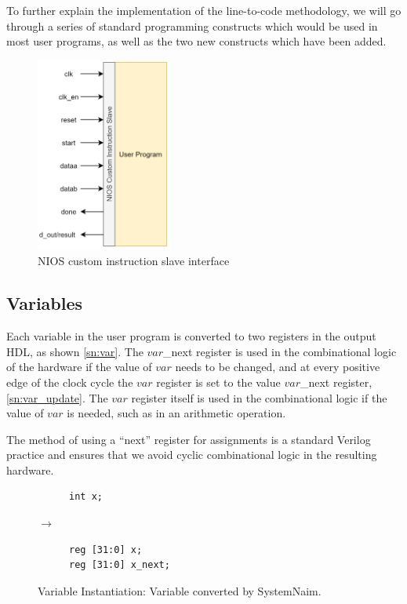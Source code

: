 To further explain the implementation of the line-to-code methodology, we will go through a series of standard programming constructs which would be used in most user programs, as well as the two new constructs which have been added.

\begin{figure}[!htb]
    \centering
    \includegraphics[width=0.4\textwidth]{04_Implementation/images/custom_instr_interface.png}
    \caption{NIOS custom instruction slave interface}
    \label{fig:nios_instr}
\end{figure}

\subsection{Variables}
\label{sn:var_sections}

Each variable in the user program is converted to two registers in the output HDL, as shown \autoref{sn:var}. The $var$\_next register is used in the combinational logic of the hardware if the value of $var$ needs to be changed, and at every positive edge of the clock cycle the $var$ register is set to the value $var$\_next register, \autoref{sn:var_update}. The $var$ register itself is used in the combinational logic if the value of $var$ is needed, such as in an arithmetic operation.

The method of using a “next” register for assignments is a standard Verilog practice and ensures that we avoid cyclic combinational logic in the resulting hardware. 

\begin{figure}[H]
\centering
\begin{subfigure}{0.15\textwidth}
    \centering
    \begin{verbatim}
int x;
    \end{verbatim}
\end{subfigure}%
{\LARGE$\rightarrow$}%
\begin{subfigure}{0.3\textwidth}
    \begin{verbatim}
reg [31:0] x;
reg [31:0] x_next;
    \end{verbatim}
\end{subfigure}
\caption{Variable Instantiation: Variable converted by SystemNaim.}
\label{sn:var}
\end{figure}

